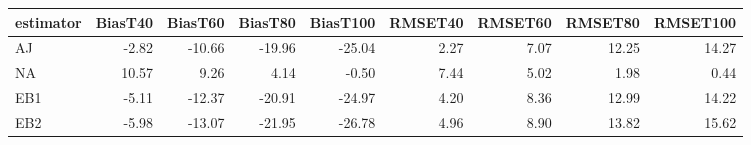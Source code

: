 \begin{table}[ht]
\centering
\begin{tabular}{lrrrrrrrr}
  \toprule
estimator & BiasT40 & BiasT60 & BiasT80 & BiasT100 & RMSET40 & RMSET60 & RMSET80 & RMSET100 \\ 
  \midrule
AJ & -2.82 & -10.66 & -19.96 & -25.04 & 2.27 & 7.07 & 12.25 & 14.27 \\ 
  NA & 10.57 & 9.26 & 4.14 & -0.50 & 7.44 & 5.02 & 1.98 & 0.44 \\ 
  EB1 & -5.11 & -12.37 & -20.91 & -24.97 & 4.20 & 8.36 & 12.99 & 14.22 \\ 
  EB2 & -5.98 & -13.07 & -21.95 & -26.78 & 4.96 & 8.90 & 13.82 & 15.62 \\ 
   \bottomrule
\end{tabular}
\end{table}
